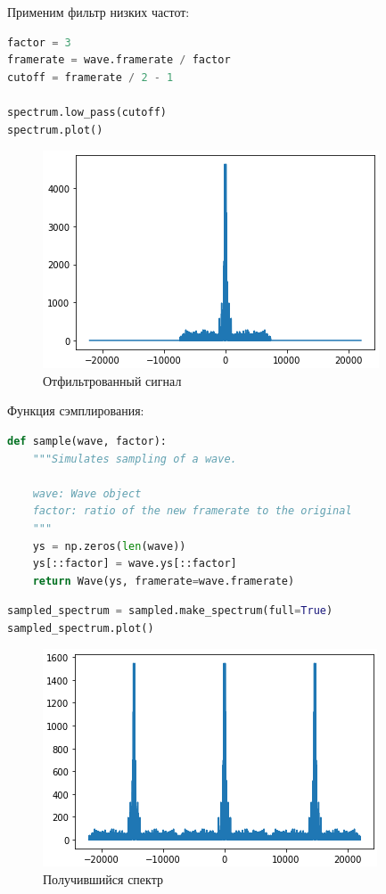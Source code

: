 Применим фильтр низких частот:

\begin{lstlisting}[language=Python]
factor = 3
framerate = wave.framerate / factor
cutoff = framerate / 2 - 1

spectrum.low_pass(cutoff)
spectrum.plot()
\end{lstlisting}
\begin{figure}[H]
	\begin{center}
		\includegraphics[scale=1]{fig/lab11/lab11_3.png}
		\caption{Отфильтрованный сигнал}
	\end{center}
\end{figure}

Функция сэмплирования:

\begin{lstlisting}[language=Python]
def sample(wave, factor):
    """Simulates sampling of a wave.
    
    wave: Wave object
    factor: ratio of the new framerate to the original
    """
    ys = np.zeros(len(wave))
    ys[::factor] = wave.ys[::factor]
    return Wave(ys, framerate=wave.framerate) 
\end{lstlisting}



\begin{lstlisting}[language=Python]
sampled_spectrum = sampled.make_spectrum(full=True)
sampled_spectrum.plot()
\end{lstlisting}
\begin{figure}[H]
	\begin{center}
		\includegraphics[scale=1]{fig/lab11/lab11_4.png}
		\caption{Получившийся спектр}
	\end{center}
\end{figure}

